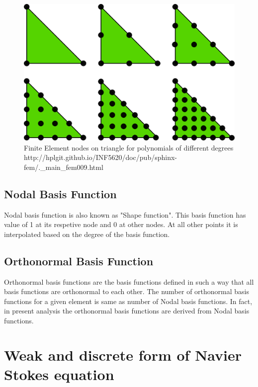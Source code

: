 \documentclass[a4paper,12pt]{book}
\begin{document}
\begin{figure}
  \includegraphics[width=\linewidth]{fem_triangle_2.png}
  \caption{Finite Element nodes on triangle for polynomials of different degrees \\ http://hplgit.github.io/INF5620/doc/pub/sphinx-fem/.\_main\_fem009.html}
  \label{fig:Nodes on Triangular Element}
\end{figure}

\subsection{Nodal Basis Function}

Nodal basis function is also known as "Shape function". This basis function has value of 1 at its respetive node and 0 at other nodes. At all other points it is interpolated based on the degree of the basis function. 

\subsection{Orthonormal Basis Function}

Orthonormal basis functions are the basis functions defined in such a way that all basis functions are orthonormal to each other. The number of orthonormal basis functions for a given element is same as number of Nodal basis functions. In fact, in present analysis the orthonormal basis functions are derived from Nodal basis functions.

\newpage
\section{Weak and discrete form of Navier Stokes equation}
\end{document}
